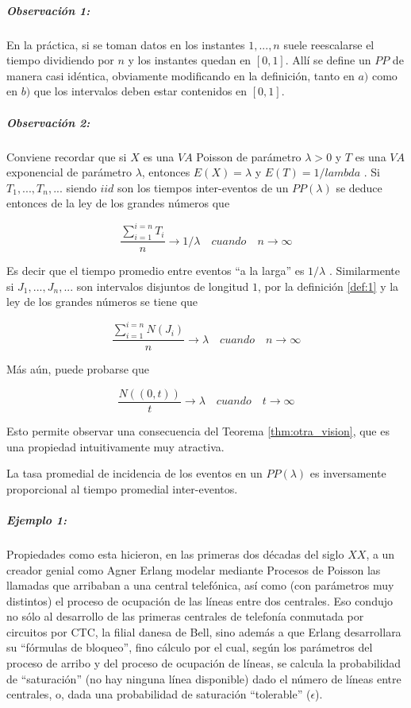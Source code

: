 \documentclass[
  oneside]{article}
\begin{document}
\hypertarget{observaciuxf3n-1}{%
\subparagraph{Observación 1:}\label{observaciuxf3n-1}}

En la práctica, si se toman datos en los instantes \(1,...,n\) suele
reescalarse el tiempo dividiendo por \(n\) y los instantes quedan en
\([0,1]\). Allí se define un \(PP\) de manera casi idéntica, obviamente
modificando en la definición, tanto en \(a)\) como en \(b)\) que los
intervalos deben estar contenidos en \([0,1]\).

\hypertarget{observaciuxf3n-2}{%
\subparagraph{Observación 2:}\label{observaciuxf3n-2}}

Conviene recordar que si \(X\) es una \(VA\) Poisson de parámetro
\(\lambda>0\) y \(T\) es una \(VA\) exponencial de parámetro
\(\lambda\), entonces \(E(X)= \lambda\) y \(E(T)=1/lambda\) . Si
\(T_1,...,T_n,...\) siendo \(iid\) son los tiempos inter-eventos de un
\(PP(\lambda)\) se deduce entonces de la ley de los grandes números que

\begin{equation}
\frac{\sum_{i=1}^{i=n} T_i}{n} \rightarrow 1/ \lambda \quad cuando \quad n\rightarrow \infty
\end{equation}

Es decir que el tiempo promedio entre eventos ``a la larga'' es
\(1/\lambda\) . Similarmente si \(J_1,...,J_n,...\) son intervalos
disjuntos de longitud \(1\), por la definición \ref{def:1} y la ley de
los grandes números se tiene que

\begin{equation}
\frac{\sum_{i=1}^{i=n} N(J_i)}{n} \rightarrow \lambda \quad cuando \quad n\rightarrow \infty
\end{equation}

Más aún, puede probarse que

\begin{equation}
\frac{N((0,t))}{t} \rightarrow \lambda \quad cuando \quad t \rightarrow \infty
\end{equation}

Esto permite observar una consecuencia del Teorema
\ref{thm:otra_vision}, que es una propiedad intuitivamente muy
atractiva.

La tasa promedial de incidencia de los eventos en un \(PP(\lambda)\) es
inversamente proporcional al tiempo promedial inter-eventos.

\hypertarget{ejemplo-1}{%
\subparagraph{Ejemplo 1:}\label{ejemplo-1}}

Propiedades como esta hicieron, en las primeras dos décadas del siglo
\(XX\), a un creador genial como Agner Erlang modelar mediante Procesos
de Poisson las llamadas que arribaban a una central telefónica, así como
(con parámetros muy distintos) el proceso de ocupación de las líneas
entre dos centrales. Eso condujo no sólo al desarrollo de las primeras
centrales de telefonía conmutada por circuitos por CTC, la filial danesa
de Bell, sino además a que Erlang desarrollara su ``fórmulas de
bloqueo'', fino cálculo por el cual, según los parámetros del proceso de
arribo y del proceso de ocupación de líneas, se calcula la probabilidad
de ``saturación'' (no hay ninguna línea disponible) dado el número de
líneas entre centrales, o, dada una probabilidad de saturación
``tolerable'' (\(\epsilon\)).
\end{document}
